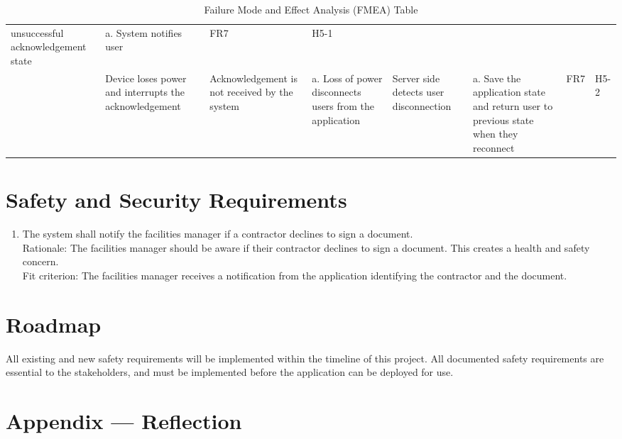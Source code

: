 \documentclass{article}
\begin{document}
\begin{table}
{\begin{tabular}{|>{\raggedright}p{2.0cm}|>{\raggedright}p{2.0cm}|>{\raggedright}p{2.5cm}|>{\raggedright}p{4cm}|>{\raggedright}p{3cm}|>{\raggedright}p{4cm}|>{\raggedright}p{1.5cm}|p{1.5cm}|}
      unsuccessful acknowledgement state & a. System notifies user &
      FR7 & H5-1 \\
      \cline{2-8}
      & Device loses power and interrupts the acknowledgement & Acknowledgement
      is not received by the system &
      a. Loss of power disconnects users from the application & Server side
      detects user disconnection & a. Save the application state and return
      user to previous state when they reconnect & FR7 & H5-2 \\
      \hline
    \end{tabular}
  }
  \caption{Failure Mode and Effect Analysis (FMEA) Table}
\end{table}

\section{Safety and Security Requirements}

\begin{enumerate}[{SFR}1.]
  \item The system shall notify the facilities manager if a contractor declines
    to sign a document.\\
    \newline Rationale: The facilities manager should be aware if
    their contractor
    declines to sign a document. This creates a health and safety concern.\\
    \newline Fit criterion: The facilities manager receives a
    notification from the
    application identifying the contractor and the document.
\end{enumerate}

\section{Roadmap}

All existing and new safety requirements will be implemented within
the timeline of this project. All documented safety requirements are
essential to the stakeholders, and must be implemented before the
application can be deployed for use.

\newpage{}

\section*{Appendix --- Reflection}
\end{document}
